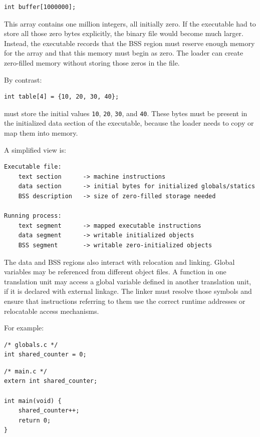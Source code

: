 \begin{verbatim}
int buffer[1000000];
\end{verbatim}

This array contains one million integers, all initially zero. If the executable had to store all those zero bytes explicitly, the binary file would become much larger. Instead, the executable records that the BSS region must reserve enough memory for the array and that this memory must begin as zero. The loader can create zero-filled memory without storing those zeros in the file.

By contrast:

\begin{verbatim}
int table[4] = {10, 20, 30, 40};
\end{verbatim}

must store the initial values \texttt{10}, \texttt{20}, \texttt{30}, and \texttt{40}. These bytes must be present in the initialized data section of the executable, because the loader needs to copy or map them into memory.

A simplified view is:

\begin{verbatim}
Executable file:
    text section      -> machine instructions
    data section      -> initial bytes for initialized globals/statics
    BSS description   -> size of zero-filled storage needed

Running process:
    text segment      -> mapped executable instructions
    data segment      -> writable initialized objects
    BSS segment       -> writable zero-initialized objects
\end{verbatim}

The data and BSS regions also interact with relocation and linking. Global variables may be referenced from different object files. A function in one translation unit may access a global variable defined in another translation unit, if it is declared with external linkage. The linker must resolve those symbols and ensure that instructions referring to them use the correct runtime addresses or relocatable access mechanisms.

For example:

\begin{verbatim}
/* globals.c */
int shared_counter = 0;
\end{verbatim}

\begin{verbatim}
/* main.c */
extern int shared_counter;

int main(void) {
    shared_counter++;
    return 0;
}
\end{verbatim}

